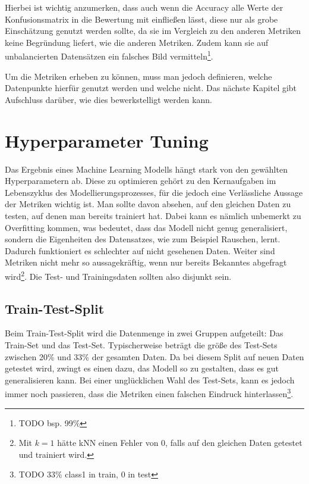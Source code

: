 Hierbei ist wichtig anzumerken, dass auch wenn die Accuracy alle Werte der Konfusionsmatrix in die Bewertung
 mit einfließen lässt, diese nur als grobe Einschätzung genutzt werden sollte, da sie im Vergleich zu den anderen
 Metriken keine Begründung liefert, wie die anderen Metriken. Zudem kann sie auf unbalancierten Datensätzen ein
 falsches Bild vermitteln\footnote{TODO bsp. 99\%}.

Um die Metriken erheben zu können, muss man jedoch definieren, welche Datenpunkte hierfür genutzt werden
 und welche nicht. Das nächste Kapitel gibt Aufschluss darüber, wie dies bewerkstelligt werden kann.


\section{Hyperparameter Tuning}

Das Ergebnis eines Machine Learning Modells hängt stark von den gewählten Hyperparametern ab. Diese zu
 optimieren gehört zu den Kernaufgaben im Lebenszyklus des Modellierungsprozesses, für die jedoch eine
 Verlässliche Aussage der Metriken wichtig ist. Man sollte davon absehen, auf den gleichen Daten zu testen,
 auf denen man bereits trainiert hat. Dabei kann es nämlich unbemerkt zu Overfitting kommen, was bedeutet,
 dass das Modell nicht genug generalisiert, sondern die Eigenheiten des Datensatzes, wie zum Beispiel Rauschen,
 lernt. Dadurch funktioniert es schlechter auf nicht gesehenen Daten. Weiter sind Metriken nicht mehr so
 aussagekräftig, wenn nur bereits Bekanntes abgefragt wird\footnote{Mit $k=1$ hätte kNN einen Fehler von $0$, falls
 auf den gleichen Daten getestet und trainiert wird.}. Die Test- und Trainingsdaten sollten also disjunkt sein.

\subsection*{Train-Test-Split}

Beim Train-Test-Split wird die Datenmenge in zwei Gruppen aufgeteilt: Das Train-Set und das Test-Set.
 Typischerweise beträgt die größe des Test-Sets zwischen 20\% und 33\% der gesamten Daten. Da bei diesem Split
 auf neuen Daten getestet wird, zwingt es einen dazu, das Modell so zu gestalten, dass es gut generalisieren
 kann. Bei einer unglücklichen Wahl des Test-Sets, kann es jedoch immer noch passieren, dass die Metriken
 einen falschen Eindruck hinterlassen\footnote{TODO 33\% class1 in train, 0 in test}.

